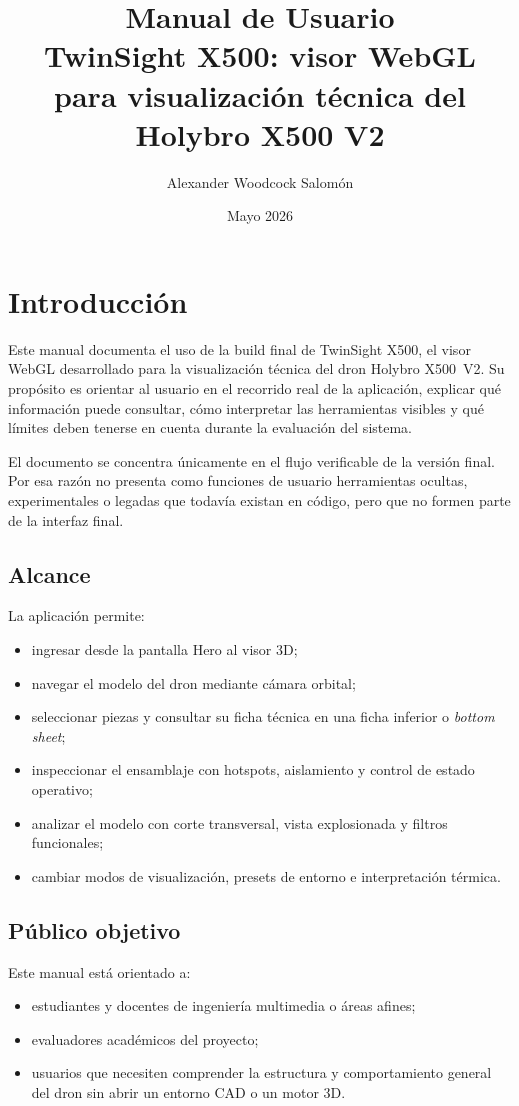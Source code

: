 \documentclass[12pt,letterpaper]{article}
\title{\textbf{Manual de Usuario}\\TwinSight X500: visor WebGL para visualización técnica del Holybro X500 V2}
\author{Alexander Woodcock Salomón}
\date{Mayo 2026}
\begin{document}
\maketitle
\tableofcontents
\newpage

\section{Introducción}
Este manual documenta el uso de la build final de TwinSight X500, el visor WebGL desarrollado para la visualización técnica del dron Holybro X500~V2. Su propósito es orientar al usuario en el recorrido real de la aplicación, explicar qué información puede consultar, cómo interpretar las herramientas visibles y qué límites deben tenerse en cuenta durante la evaluación del sistema.

El documento se concentra únicamente en el flujo verificable de la versión final. Por esa razón no presenta como funciones de usuario herramientas ocultas, experimentales o legadas que todavía existan en código, pero que no formen parte de la interfaz final.

\subsection{Alcance}
La aplicación permite:
\begin{itemize}
    \item ingresar desde la pantalla Hero al visor 3D;
    \item navegar el modelo del dron mediante cámara orbital;
    \item seleccionar piezas y consultar su ficha técnica en una ficha inferior o \textit{bottom sheet};
    \item inspeccionar el ensamblaje con hotspots, aislamiento y control de estado operativo;
    \item analizar el modelo con corte transversal, vista explosionada y filtros funcionales;
    \item cambiar modos de visualización, presets de entorno e interpretación térmica.
\end{itemize}

\subsection{Público objetivo}
Este manual está orientado a:
\begin{itemize}
    \item estudiantes y docentes de ingeniería multimedia o áreas afines;
    \item evaluadores académicos del proyecto;
    \item usuarios que necesiten comprender la estructura y comportamiento general del dron sin abrir un entorno CAD o un motor 3D.
\end{itemize}
\end{document}

